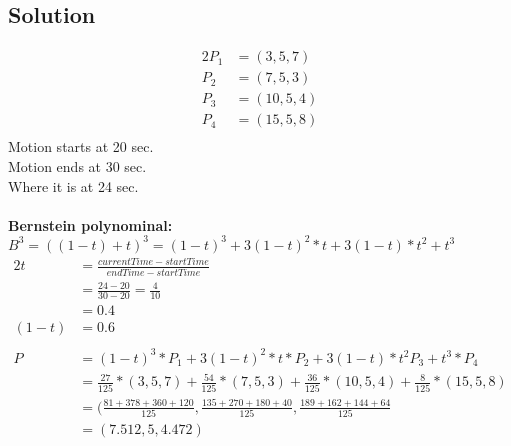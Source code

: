 \documentclass[12pt,fleqn,reqno]{article}
\begin{document}
\subsection{Solution}
\begin{alignat*}{2}
	P_1 &= (3, 5, 7)\\
	P_2 &= (7, 5, 3)\\
	P_3 &= (10, 5, 4)\\
	P_4 &= (15, 5, 8)\\
\end{alignat*}
Motion starts at 20 sec. \\
Motion ends at 30 sec. \\
Where it is at 24 sec. \\
\\
\textbf{Bernstein polynominal:}\\
\(B^3 = (( 1-t) +t)^3 = (1-t)^3 + 3(1- t)^2 * t + 3(1 - t) * t^2 + t^3\)
\begin{alignat*}{2}
	t	&= \frac{currentTime - startTime}{endTime -startTime}\\
		&= \frac{24-20}{30-20} = \frac{4}{10}\\
		&= 0.4\\
(1-t)		&= 0.6\\
	\\
	P	&= (1-t)^3 * P_1 + 3(1- t)^2 * t *P_2 + 3(1 - t) * t^2 P_3 + t^3 *P_4\\
		&= \frac{27}{125} * (3,5,7) +\frac{54}{125} * (7,5,3) + \frac{36}{125}* (10, 5,4) + \frac{8}{125} * (15,5,8)\\
		&=  ( \frac{81 + 378 + 360 +120}{125}, \frac{135+270+180+40}{125}, \frac{189+162+144+64}{125}\\
		&= (7.512, 5, 4.472)
\end{alignat*}
\end{document}
